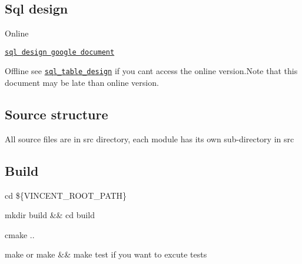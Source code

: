 

\href{https://app.codacy.com/app/maidamai0/vincent?utm_source=github.com&utm_medium=referral&utm_content=advanced-data-processing-company/vincent&utm_campaign=Badge_Grade_Settings}{\tt } \href{https://travis-ci.org/advanced-data-processing-company/vincent}{\tt } \href{https://ci.appveyor.com/project/maidamai0/vincent}{\tt } \href{https://lgtm.com/projects/g/advanced-data-processing-company/vincent/alerts/}{\tt } \href{https://lgtm.com/projects/g/advanced-data-processing-company/vincent/context:javascript}{\tt }

\subsection*{Sql design}


\begin{DoxyItemize}
\item Online

\href{https://docs.google.com/document/d/1QlFliN9hr0bRWUpu1whWGgTl2qbUMroOrxDV7gtdL20/edit}{\tt sql design google document}
\item Offline see \href{https://htmlpreview.github.io/?https://github.com/advanced-data-processing-company/vincent/blob/master/sql_table_design.html}{\tt sql\+\_\+table\+\_\+design} if you can\textquotesingle{}t access the online version.\+Note that this document may be late than online version.
\end{DoxyItemize}

\subsection*{Source structure}

All source files are in {\ttfamily src} directory, each module has its own sub-\/directory in {\ttfamily src}

\subsection*{Build}


\begin{DoxyEnumerate}
\item {\ttfamily cd \$\{V\+I\+N\+C\+E\+N\+T\+\_\+\+R\+O\+O\+T\+\_\+\+P\+A\+TH\}}
\item {\ttfamily mkdir build \&\& cd build}
\item {\ttfamily cmake ..}
\item {\ttfamily make} or {\ttfamily make \&\& make test} if you want to excute tests
\end{DoxyEnumerate}

